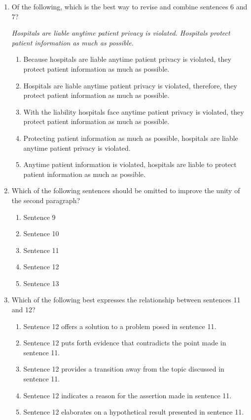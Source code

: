 \begin{enumerate}
\bigskip
\item{Of the following, which is the best way to revise and combine sentences 6 and 7?}

\bigskip
\textit{Hospitals are liable anytime patient privacy is violated. Hospitals protect patient information as much as possible.}

\begin{enumerate}[label=(\Alph*)]
\item{Because hospitals are liable anytime patient privacy is violated, they protect patient information as much as possible.}
\item{Hospitals are liable anytime patient privacy is violated, therefore, they protect patient information as much as possible.}
\item{With the liability hospitals face anytime patient privacy is violated, they protect patient information as much as possible.}
\item{Protecting patient information as much as possible, hospitals are liable anytime patient privacy is violated.}
\item{Anytime patient information is violated, hospitals are liable to protect patient information as much as possible.}
\end{enumerate}

\newpage
\item{Which of the following sentences should be omitted to improve the unity of the second paragraph?}
\begin{enumerate}[label=(\Alph*)]
\item{Sentence 9}
\item{Sentence 10}
\item{Sentence 11}
\item{Sentence 12}
\item{Sentence 13}
\end{enumerate}

\bigskip
\item{Which of the following best expresses the relationship between sentences 11 and 12?}

\begin{enumerate}[label=(\Alph*)]
\item{Sentence 12 offers a solution to a problem posed in sentence 11.}
\item{Sentence 12 puts forth evidence that contradicts the point made in sentence 11.}
\item{Sentence 12 provides a transition away from the topic discussed in sentence 11.}
\item{Sentence 12 indicates a reason for the assertion made in sentence 11.} 
\item{Sentence 12 elaborates on a hypothetical result presented in sentence 11.}
\end{enumerate}
\end{enumerate}